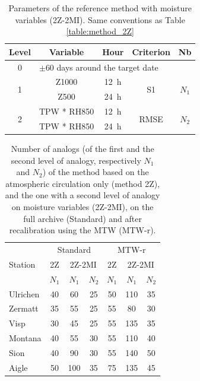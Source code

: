 \documentclass[hess, manuscript]{copernicus}
\begin{document}
\begin{table}[htb]
	\caption{Parameters of the reference method with moisture variables (2Z-2MI). Same conventions as Table \ref{table:method_2Z}}
	\footnotesize
	\begin{center}
		\begin{tabular}{ccccc}
			\hline 
			Level & Variable & Hour & Criterion & Nb \\ 
			\hline 
			0 & \multicolumn{4}{l}{$\pm 60$ days around the target date} \\
			\hline 
			\multirow{2}{*}{1} & Z1000 & 12~h & \multirow{2}{*}{S1} & \multirow{2}{*}{$N_{1}$} \\
			& Z500 & 24~h & & \\ 
			\hline
			\multirow{2}{*}{2} & TPW * RH850 & 12~h & \multirow{2}{*}{RMSE} & \multirow{2}{*}{$N_{2}$} \\
			& TPW * RH850 & 24~h & & \\ 
			\hline 
		\end{tabular} 
	\end{center}
	\label{table:method_2Z-2MI}
\end{table}

\begin{table}[htb]
	\caption{Number of analogs (of the first and the second level of analogy, respectively $N_{1}$ and $N_{2}$) of the method based on the atmospheric circulation only (method 2Z), and the one with a second level of analogy on moisture variables (2Z-2MI), on the full archive (Standard) and after recalibration using the MTW (MTW-r).}
	\begin{center}
		\begin{tabular}{l c c c c c c }
			\hline
			\multirow{3}{*}{Station} & \multicolumn{3}{c}{Standard} & \multicolumn{3}{c}{MTW-r} \\
			& 2Z & \multicolumn{2}{c}{2Z-2MI} & 2Z & \multicolumn{2}{c}{2Z-2MI}\\
			& $N_{1}$ & $N_{1}$ & $N_{2}$ & $N_{1}$ & $N_{1}$ & $N_{2}$\\ 
			\hline
			Ulrichen & 40 & 60 & 25 & 50 & 110 & 35\\
			Zermatt & 35 & 55 & 25 & 55 & 80 & 30\\
			Visp & 30 & 45 & 25 & 55 & 135 & 35\\
			Montana & 40 & 55 & 30 & 55 & 110 & 40\\
			Sion & 40 & 90 & 30 & 55 & 140 & 50\\
			Aigle & 50 & 100 & 35 & 75 & 135 & 45\\ 
			\hline
		\end{tabular}
	\end{center}	
	\label{table:analog_nb}
\end{table}
\end{document}
